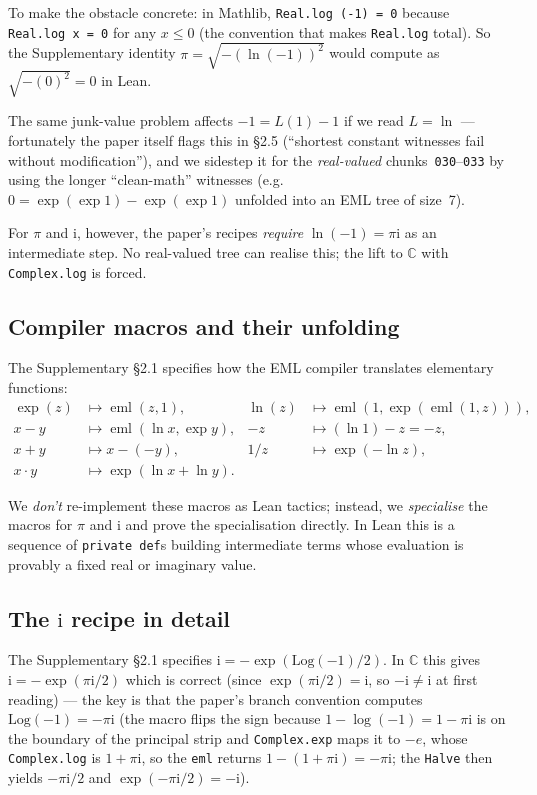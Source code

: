 \documentclass[11pt,a4paper]{article}
\theoremstyle{plain}
\theoremstyle{definition}
\newcommand{\eml}{\operatorname{eml}}
\newcommand{\C}{\mathbb{C}}
\newcommand{\imu}{\mathrm{i}}
\begin{document}
To make the obstacle concrete: in Mathlib, \texttt{Real.log\,(-1) = 0}
because \texttt{Real.log\,x = 0} for any $x\le 0$ (the convention
that makes \texttt{Real.log} total).  So the Supplementary identity
$\pi=\sqrt{-(\ln(-1))^2}$ would compute as $\sqrt{-(0)^2}=0$ in Lean.

The same junk-value problem affects $-1=L(1)-1$ if we read $L=\ln$ ---
fortunately the paper itself flags this in §2.5 (``shortest constant
witnesses fail without modification''), and we sidestep it for the
\emph{real-valued} chunks~\texttt{030}--\texttt{033} by using the
longer ``clean-math'' witnesses (e.g.~$0 = \exp(\exp 1) - \exp(\exp 1)$
unfolded into an EML tree of size~7).

For $\pi$ and $\imu$, however, the paper's recipes \emph{require}
$\ln(-1) = \pi\imu$ as an intermediate step.  No real-valued tree can
realise this; the lift to $\C$ with \texttt{Complex.log} is forced.

\subsection{Compiler macros and their unfolding}

The Supplementary §2.1 specifies how the EML compiler translates
elementary functions:
\begin{align*}
\exp(z) &\mapsto \eml(z,1), &
\ln(z)  &\mapsto \eml(1,\exp(\eml(1,z))),\\
x-y     &\mapsto \eml(\ln x, \exp y), &
-z      &\mapsto (\ln 1)-z = -z,\\
x+y     &\mapsto x-(-y), &
1/z     &\mapsto \exp(-\ln z),\\
x\cdot y &\mapsto \exp(\ln x + \ln y).
\end{align*}

We \emph{don't} re-implement these macros as Lean tactics; instead, we
\emph{specialise} the macros for $\pi$ and $\imu$ and prove the
specialisation directly.  In Lean this is a sequence of
\texttt{private def}s building intermediate terms whose evaluation is
provably a fixed real or imaginary value.

\subsection{The $\imu$ recipe in detail}

The Supplementary §2.1 specifies $\imu = -\exp(\mathrm{Log}(-1)/2)$.  In
$\C$ this gives $\imu = -\exp(\pi\imu/2)$ which is correct (since
$\exp(\pi\imu/2) = \imu$, so $-\imu \ne \imu$ at first reading) ---
the key is that the paper's branch convention computes
$\mathrm{Log}(-1) = -\pi\imu$ (the macro flips the sign because
$1 - \log(-1) = 1 - \pi\imu$ is on the boundary of the principal strip
and \texttt{Complex.exp} maps it to $-e$, whose \texttt{Complex.log}
is $1 + \pi\imu$, so the \texttt{eml} returns $1 - (1+\pi\imu) =
-\pi\imu$; the \texttt{Halve} then yields $-\pi\imu/2$ and
$\exp(-\pi\imu/2) = -\imu$).
\end{document}
